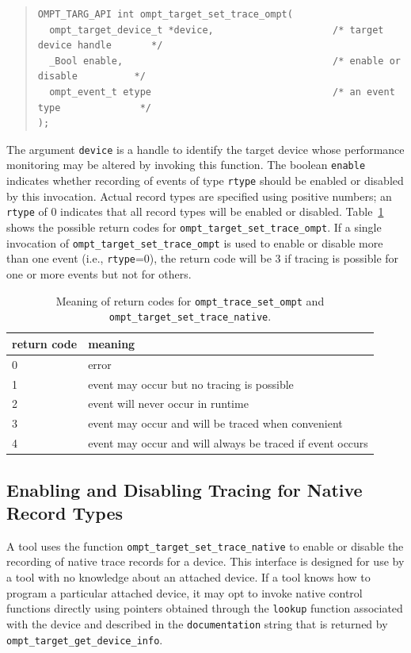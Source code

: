 \documentclass{article}
\begin{document}
\begin{quote}
\begin{lstlisting}
OMPT_TARG_API int ompt_target_set_trace_ompt(
  ompt_target_device_t *device,                     /* target device handle       */
  _Bool enable,                                     /* enable or disable          */
  ompt_event_t etype                                /* an event type              */
);
\end{lstlisting}
\end{quote}
The argument \lstinline|device| is a handle to identify the target device whose performance monitoring may be altered by invoking this function. 
The boolean \lstinline|enable| indicates whether recording of events of type \lstinline|rtype| should be enabled or disabled by this invocation.
Actual record types are specified using positive numbers; an \lstinline|rtype| of 0 indicates that all record types will be enabled or disabled.
Table~\ref{table:record_set} shows the possible return codes for \lstinline|ompt_target_set_trace_ompt|. 
If a single invocation of \lstinline|ompt_target_set_trace_ompt| is used to enable or disable more than one event (i.e., \lstinline|rtype|=0), the return code will be 3 if tracing is possible for one or more events but not for others.
\begin{table}
\centering
\begin{tabular}{|l|l|}
\hline
return code & meaning \\\hline
0 & error\\\hline
1 & event may occur but no tracing is possible\\\hline
2 & event will never occur in runtime\\\hline
3 & event may occur and will be traced  when convenient\\\hline
4 & event may occur and will always be traced if event occurs\\\hline
\end{tabular}
\caption{Meaning of return codes for {\tt ompt\_trace\_set\_ompt} and {\tt ompt\_target\_set\_trace\_native}.}
\label{table:record_set}
\end{table}




\subsection{Enabling and Disabling Tracing for Native Record Types}
\label{sec:trace-event-native}
A tool uses the function \lstinline|ompt_target_set_trace_native| to enable or disable the recording of native trace records for a device. This interface is designed for use by a tool with no 
knowledge about an attached device. If a tool knows how to program a particular attached device, it may opt to invoke native control functions directly using pointers obtained through the \lstinline|lookup| function associated with the device and described in the \lstinline|documentation| string that is returned by \lstinline|ompt_target_get_device_info|.
\end{document}
